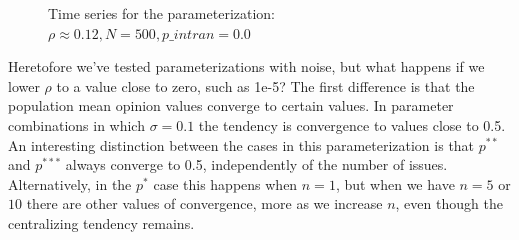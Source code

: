 \documentclass{article}
\begin{document}
\begin{figure}[H]
      \caption{Time series for the parameterization: \(\rho \approx 0.12, N =
        500, p\_intran = 0.0 \)}
      \label{fig:tseries3}
    \end{figure}

    Heretofore we've tested parameterizations with noise, but what happens if we
    lower \(\rho\) to a value close to zero, such as 1e-5? The first difference is
    that the population mean opinion values converge to certain values. In
    parameter combinations in which \(\sigma = 0.1\) the tendency is convergence
    to values close to 0.5. An interesting distinction between the cases in this
    parameterization is that \(p^{**}\) and \(p^{***}\) always converge to 0.5,
    independently of the number of issues. Alternatively, in the \(p^{*}\) case
    this happens when \(n=1\), but when we have \(n=5\) or \(10\) there are
    other values of convergence, more as we increase \(n\), even though the
    centralizing tendency remains.
\end{document}
